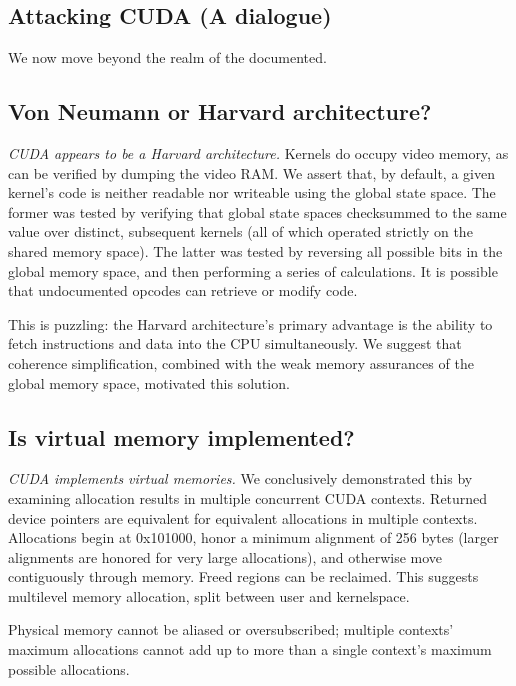 \documentclass[letterpaper,10pt]{article}
\begin{document}
\begin{multicols}{2}
\section{Attacking CUDA (A dialogue)}
We now move beyond the realm of the documented.
\subsection{Von Neumann or Harvard architecture?}
\textit{CUDA appears to be a Harvard architecture.} Kernels do occupy
video memory, as can be verified by dumping the video RAM. We assert that, by
default, a given kernel's code is neither readable nor writeable using
the global state space. The former was tested by verifying that global state
spaces checksummed to the same value over distinct, subsequent kernels (all of
which operated strictly on the shared memory space). The latter was tested by
reversing all possible bits in the global memory space, and then performing a
series of calculations. It is possible that undocumented opcodes can retrieve
or modify code.

This is puzzling: the Harvard architecture's primary advantage is the ability
to fetch instructions and data into the CPU simultaneously. We suggest that
coherence simplification, combined with the weak memory assurances of the global
memory space, motivated this solution.
\subsection{Is virtual memory implemented?}
\textit{CUDA implements virtual memories.} We conclusively demonstrated this
by examining allocation results in multiple concurrent CUDA contexts. Returned
device pointers are equivalent for equivalent allocations in multiple contexts.
Allocations begin at 0x101000, honor a minimum alignment of 256 bytes (larger
alignments are honored for very large allocations), and otherwise move
contiguously through memory. Freed regions can be reclaimed. This suggests
multilevel memory allocation, split between user and kernelspace.

Physical memory cannot be aliased or oversubscribed; multiple contexts'
maximum allocations cannot add up to more than a single context's maximum
possible allocations.

\end{multicols}
\end{document}
